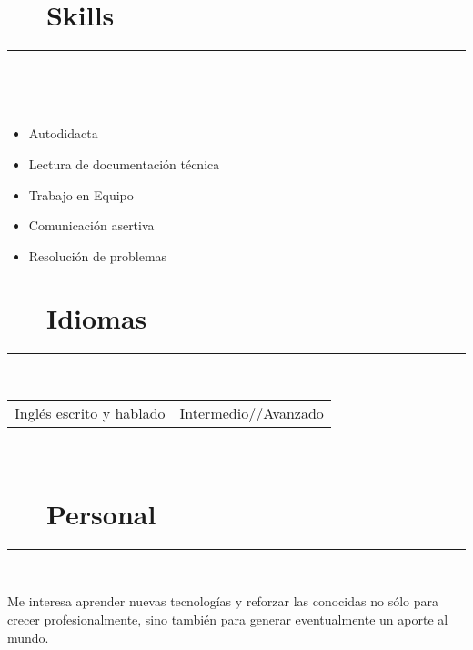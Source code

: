 \documentclass{article}
\begin{document}
\newpage

\section*{\faCoffee ~~ Skills} 
\hrule
\

\

\begin{multicols}{2}
    \begin{itemize}
        \item Autodidacta
        \item Lectura de documentación técnica
        \item Trabajo en Equipo
        \item Comunicación asertiva
        \item Resolución de problemas
    \end{itemize}
\end{multicols}

\section*{\faLanguage ~~ Idiomas}
\hrule

\
\newline
\

\begin{tabular}{l | l}
    Inglés escrito y hablado & Intermedio//Avanzado
\end{tabular}

\
\newline
\

\section*{\faHeartO ~~ Personal} 
\hrule

\
\newline
\

\noindent Me interesa aprender nuevas tecnologías y reforzar las conocidas no sólo para crecer profesionalmente, sino también para generar eventualmente un aporte al mundo.
\end{document}
